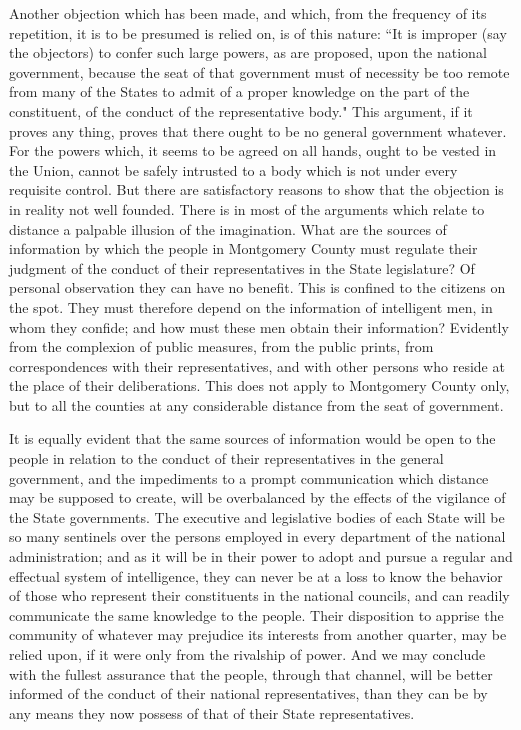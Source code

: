 Another objection which has been made, and which, from the frequency of its repetition, it is to be presumed is relied on, is of this nature: ``It is improper (say the objectors) to confer such large powers, as are proposed, upon the national government, because the seat of that government must of necessity be too remote from many of the States to admit of a proper knowledge on the part of the constituent, of the conduct of the representative body." This argument, if it proves any thing, proves that there ought to be no general government whatever. For the powers which, it seems to be agreed on all hands, ought to be vested in the Union, cannot be safely intrusted to a body which is not under every requisite control. But there are satisfactory reasons to show that the objection is in reality not well founded. There is in most of the arguments which relate to distance a palpable illusion of the imagination. What are the sources of information by which the people in Montgomery County must regulate their judgment of the conduct of their representatives in the State legislature? Of personal observation they can have no benefit. This is confined to the citizens on the spot. They must therefore depend on the information of intelligent men, in whom they confide; and how must these men obtain their information? Evidently from the complexion of public measures, from the public prints, from correspondences with their representatives, and with other persons who reside at the place of their deliberations. This does not apply to Montgomery County only, but to all the counties at any considerable distance from the seat of government.

It is equally evident that the same sources of information would be open to the people in relation to the conduct of their representatives in the general government, and the impediments to a prompt communication which distance may be supposed to create, will be overbalanced by the effects of the vigilance of the State governments. The executive and legislative bodies of each State will be so many sentinels over the persons employed in every department of the national administration; and as it will be in their power to adopt and pursue a regular and effectual system of intelligence, they can never be at a loss to know the behavior of those who represent their constituents in the national councils, and can readily communicate the same knowledge to the people. Their disposition to apprise the community of whatever may prejudice its interests from another quarter, may be relied upon, if it were only from the rivalship of power. And we may conclude with the fullest assurance that the people, through that channel, will be better informed of the conduct of their national representatives, than they can be by any means they now possess of that of their State representatives.

